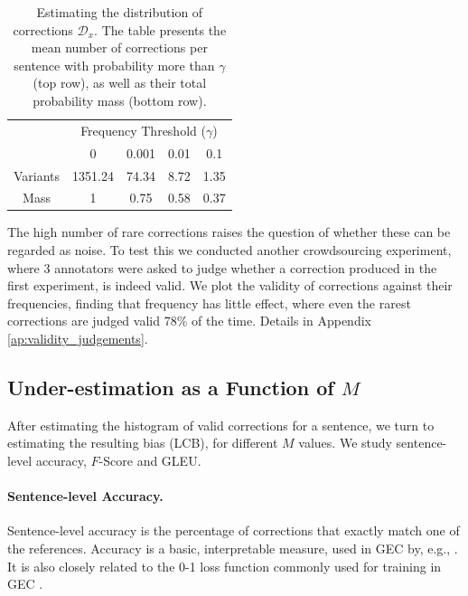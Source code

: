 \documentclass[a4paper]{article}
\begin{document}
\begin{table}[h!]
  \centering
  \small
  \singlespacing
  \begin{tabular}{c|c|c|c|c|}
    & \multicolumn{4}{c|}{Frequency Threshold ($\gamma$)}\\ 
    & \multicolumn{1}{c}{0} & \multicolumn{1}{c}{0.001} & \multicolumn{1}{c}{0.01} & \multicolumn{1}{c|}{0.1}
    \\
    \hline
    Variants & 1351.24 & 74.34 & 8.72 & 1.35
    \\
    Mass & 1 & 0.75 & 0.58 & 0.37\\
    \hline
  \end{tabular}
  \caption{\label{tab:corrections_dist}
    Estimating the distribution of corrections $\mathcal{D}_x$.
    The table presents the mean number of corrections per sentence with probability more than
    $\gamma$ (top row), as well as their total probability mass (bottom row).
  }
\end{table}

The high number of rare corrections raises the question of whether these can be regarded as noise.
To test this we conducted another crowdsourcing experiment, where 3 annotators were asked to judge whether a correction produced in the first experiment, is indeed valid.
We plot the validity of corrections against their frequencies, finding that frequency has little effect,
where even the rarest corrections are judged valid 78\% of the time.
Details in Appendix \ref{ap:validity_judgements}.

\subsection{Under-estimation as a Function of $M$} \label{subsec:Assessment-values}

After estimating the histogram of valid corrections for a sentence, we turn to estimating the resulting bias (LCB), for different $M$ values. 
We study sentence-level accuracy, $F$-Score and GLEU.

\paragraph{Sentence-level Accuracy.}
Sentence-level accuracy is the percentage of corrections that
exactly match one of the references.
Accuracy is a basic, interpretable measure, used in GEC by, e.g., .
It is also closely related to the 0-1 loss function commonly used
for training in GEC \cite{chodorow2012problems,rozovskaya2013joint}. 
\end{document}

